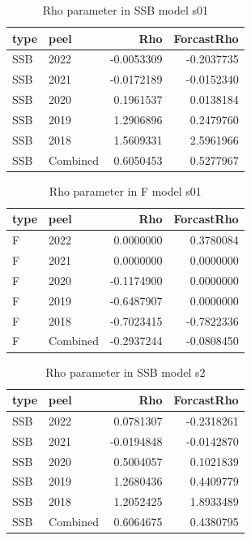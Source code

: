 \documentclass[
]{article}
\begin{document}
\begin{table}[H]

\caption{\label{tab:unnamed-chunk-16}Rho parameter in SSB model s01}
\centering
\begin{tabular}[t]{llrr}
\toprule
type & peel & Rho & ForcastRho\\
\midrule
SSB & 2022 & -0.0053309 & -0.2037735\\
SSB & 2021 & -0.0172189 & -0.0152340\\
SSB & 2020 & 0.1961537 & 0.0138184\\
SSB & 2019 & 1.2906896 & 0.2479760\\
SSB & 2018 & 1.5609331 & 2.5961966\\
\addlinespace
SSB & Combined & 0.6050453 & 0.5277967\\
\bottomrule
\end{tabular}
\end{table}

\begin{table}[H]

\caption{\label{tab:unnamed-chunk-16}Rho parameter in F model s01}
\centering
\begin{tabular}[t]{llrr}
\toprule
type & peel & Rho & ForcastRho\\
\midrule
F & 2022 & 0.0000000 & 0.3780084\\
F & 2021 & 0.0000000 & 0.0000000\\
F & 2020 & -0.1174900 & 0.0000000\\
F & 2019 & -0.6487907 & 0.0000000\\
F & 2018 & -0.7023415 & -0.7822336\\
\addlinespace
F & Combined & -0.2937244 & -0.0808450\\
\bottomrule
\end{tabular}
\end{table}

\begin{table}[H]

\caption{\label{tab:unnamed-chunk-16}Rho parameter in SSB model s2}
\centering
\begin{tabular}[t]{llrr}
\toprule
type & peel & Rho & ForcastRho\\
\midrule
SSB & 2022 & 0.0781307 & -0.2318261\\
SSB & 2021 & -0.0194848 & -0.0142870\\
SSB & 2020 & 0.5004057 & 0.1021839\\
SSB & 2019 & 1.2680436 & 0.4409779\\
SSB & 2018 & 1.2052425 & 1.8933489\\
\addlinespace
SSB & Combined & 0.6064675 & 0.4380795\\
\bottomrule
\end{tabular}
\end{table}
\end{document}

